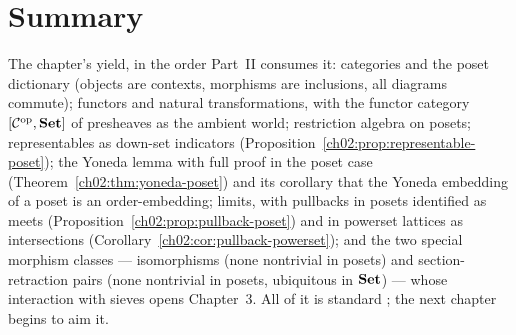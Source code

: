 \section{Summary}\label{ch02:sec:summary}

The chapter's yield, in the order Part~II consumes it: categories and
the poset dictionary (objects are contexts, morphisms are inclusions,
all diagrams commute); functors and natural transformations, with the
functor category $[\mathcal{C}^{\mathrm{op}}, \mathbf{Set}]$ of presheaves as the
ambient world; restriction algebra on posets; representables as
down-set indicators (Proposition~\ref{ch02:prop:representable-poset});
the Yoneda lemma with full proof in the poset case
(Theorem~\ref{ch02:thm:yoneda-poset}) and its corollary that the
Yoneda embedding of a poset is an order-embedding; limits, with
pullbacks in posets identified as meets
(Proposition~\ref{ch02:prop:pullback-poset}) and in powerset lattices
as intersections (Corollary~\ref{ch02:cor:pullback-powerset}); and the
two special morphism classes --- isomorphisms (none nontrivial in
posets) and section-retraction pairs (none nontrivial in posets,
ubiquitous in $\mathbf{Set}$) --- whose interaction with sieves opens
Chapter~3. All of it is standard
\cite{awodey,riehl,maclanecwm,maclane}; the next chapter begins to
aim it.
